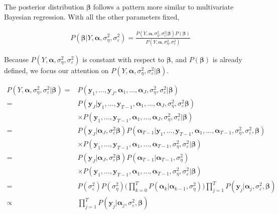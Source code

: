 \documentclass[
]{article}
\begin{document}
The posterior distribution \(\boldsymbol{\beta}\) follows a pattern more similar to multivariate Bayesian regression. With all the other parameters fixed,

\begin{equation*}
\begin{aligned}
P(\boldsymbol{\beta}|Y, \boldsymbol{\alpha}, \sigma^2_\eta, \sigma^2_\varepsilon) = \frac{P(Y, \boldsymbol{\alpha}, \sigma^2_\eta, \sigma^2_\varepsilon|\boldsymbol{\beta})P(\boldsymbol{\beta})}{P(Y, \boldsymbol{\alpha}, \sigma^2_\eta, \sigma^2_\varepsilon)}
\end{aligned}
\end{equation*}

Because \(P(Y, \boldsymbol{\alpha}, \sigma^2_\eta, \sigma^2_\varepsilon)\) is constant with respect to \(\boldsymbol{\beta}\), and \(P(\boldsymbol{\beta})\) is already defined, we focus our attention on \(P(Y, \boldsymbol{\alpha}, \sigma^2_\eta, \sigma^2_\varepsilon|\boldsymbol{\beta})\).

\begin{equation*}
\begin{aligned}
P(Y, \boldsymbol{\alpha}, \sigma^2_\eta, \sigma^2_\varepsilon|\boldsymbol{\beta}) = &P(\boldsymbol{y}_1, ..., \boldsymbol{y}_J, \boldsymbol{\alpha}_1, ..., \boldsymbol{\alpha}_J, \sigma^2_\eta, \sigma^2_\varepsilon | \boldsymbol{\beta})\\
= & P(\boldsymbol{y}_J|\boldsymbol{y}_1, ..., \boldsymbol{y}_{T-1}, \boldsymbol{\alpha}_1, ..., \boldsymbol{\alpha}_J, \sigma^2_\eta, \sigma^2_\varepsilon \boldsymbol{\beta})\\
& \times P(\boldsymbol{y}_1, ..., \boldsymbol{y}_{T-1}, \boldsymbol{\alpha}_1, ..., \boldsymbol{\alpha}_J, \sigma^2_\eta, \sigma^2_\varepsilon | \boldsymbol{\beta})\\
= & P(\boldsymbol{y}_J|\boldsymbol{\alpha}_J, \sigma^2_\varepsilon \boldsymbol{\beta})P(\boldsymbol{\alpha}_{T-1}|\boldsymbol{y}_1, ..., \boldsymbol{y}_{T-1}, \boldsymbol{\alpha}_1, ..., {\boldsymbol{\alpha}_{T-1}}, \sigma^2_\eta, \sigma^2_\varepsilon, \boldsymbol{\beta})\\
& \times P(\boldsymbol{y}_1, ..., \boldsymbol{y}_{T-1}, \boldsymbol{\alpha}_1, ..., {\boldsymbol{\alpha}_{T-1}}, \sigma^2_\eta, \sigma^2_\varepsilon | \boldsymbol{\beta})\\
= & P(\boldsymbol{y}_J|\boldsymbol{\alpha}_J, \sigma^2_\varepsilon \boldsymbol{\beta})P(\boldsymbol{\alpha}_{T-1}|{\boldsymbol{\alpha}_{T-1}}, \sigma^2_\eta)\\
& \times P(\boldsymbol{y}_1, ..., \boldsymbol{y}_{T-1}, \boldsymbol{\alpha}_1, ..., {\boldsymbol{\alpha}_{T-1}}, \sigma^2_\eta, \sigma^2_\varepsilon | \boldsymbol{\beta})\\
= &P(\sigma^2_\varepsilon)P(\sigma^2_\eta)\bigg(\prod^T_{k=0} P(\boldsymbol{\alpha}_k|\boldsymbol{\alpha}_{k-1},\sigma^2_{\eta})\bigg) \prod^T_{j=1} P(\boldsymbol{y}_j|\boldsymbol{\alpha}_j, \sigma^2_\varepsilon, \boldsymbol{\beta})\\
\propto & \prod^T_{j=1} P(\boldsymbol{y}_j|\boldsymbol{\alpha}_j, \sigma^2_\varepsilon, \boldsymbol{\beta})
\end{aligned}
\end{equation*}
\end{document}
